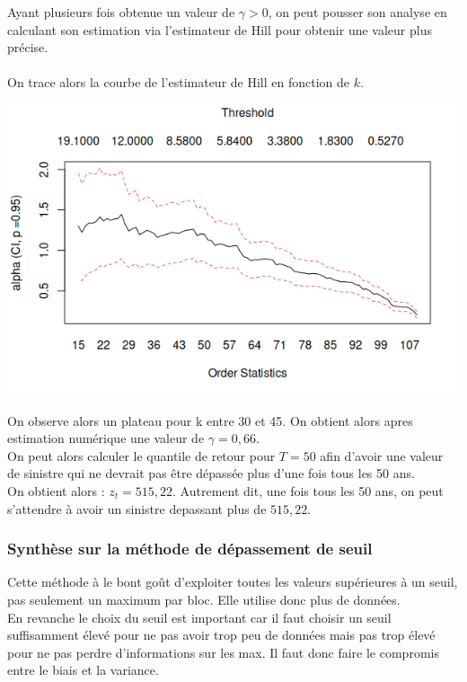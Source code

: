 \documentclass{article}
\theoremstyle{plain}
\theoremstyle{definition}
\theoremstyle{plain}
\begin{document}
Ayant plusieurs fois obtenue un valeur de $\gamma > 0$, on peut pousser son analyse en calculant son estimation via l'estimateur de Hill pour obtenir une valeur plus précise.
\\
\\
On trace alors la courbe de l'estimateur de Hill en fonction de $k$.

\begin{center}
	\includegraphics[scale=0.65]{./images/danishsad.png} 
\end{center}

On observe alors un plateau pour k entre 30 et 45. On obtient alors apres estimation numérique une valeur de $\gamma = 0,66$.
\\
On peut alors calculer le quantile de retour pour $T=50$ afin d'avoir une valeur de sinistre qui ne devrait pas être dépassée plus d'une fois tous les 50 ans.
\\
On obtient alors : $z_t = 515,22$. Autrement dit, une fois tous les 50 ans, on peut s'attendre à avoir un sinistre depassant plus de $515,22$.

\subsubsection{Synthèse sur la méthode de dépassement de seuil}
Cette méthode à le bont goût d'exploiter toutes les valeurs supérieures à un seuil, pas seulement un maximum par bloc. Elle utilise donc plus de données.
\\
En revanche le choix du seuil est important car il faut choisir un seuil suffisamment élevé pour ne pas avoir trop peu de données mais pas trop élevé pour ne pas perdre d'informations sur les max. Il faut donc faire le compromis entre le biais et la variance.
\end{document}
